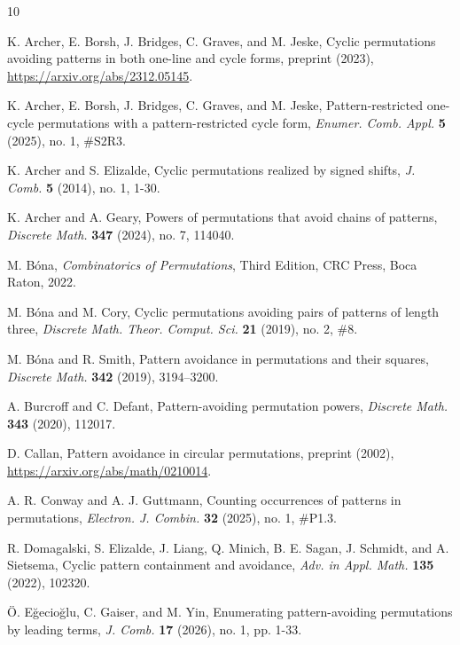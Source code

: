 \documentclass[11pt]{article}
\theoremstyle{definition}
\numberwithin{equation}{section}
\begin{document}
\begin{thebibliography}{10}

 K. Archer, E. Borsh, J. Bridges, C. Graves, and M. Jeske, Cyclic permutations avoiding patterns in both one-line and cycle forms, preprint (2023), \url{https://arxiv.org/abs/2312.05145}.

 K. Archer, E. Borsh, J. Bridges, C. Graves, and M. Jeske, Pattern-restricted one-cycle permutations with a pattern-restricted cycle form, \textit{Enumer. Comb. Appl.} \textbf{5} (2025), no. 1, \#S2R3.

 K. Archer and S. Elizalde, Cyclic permutations realized by signed shifts, \textit{J. Comb.} \textbf{5} (2014), no. 1, 1-30.

 K. Archer and A. Geary, Powers of permutations that avoid chains of patterns, \textit{Discrete Math.} \textbf{347} (2024), no. 7, 114040.

 M. B\'{o}na, \textit{Combinatorics of Permutations}, Third Edition, CRC Press, Boca Raton, 2022.

 M. B\'{o}na and M. Cory, Cyclic permutations avoiding pairs of patterns of length three, \textit{Discrete Math. Theor. Comput. Sci.} \textbf{21} (2019), no. 2, \#8.

 M. B\'{o}na and R. Smith, Pattern avoidance in permutations and their squares, \textit{Discrete Math.} \textbf{342} (2019), 3194–3200.

 A. Burcroff and C. Defant, Pattern-avoiding permutation powers, \textit{Discrete Math.} \textbf{343} (2020), 112017.

 D. Callan, Pattern avoidance in circular permutations, preprint (2002), \url{https://arxiv.org/abs/math/0210014}.

 A. R. Conway and A. J. Guttmann, Counting occurrences of patterns in permutations, \textit{Electron. J. Combin.} \textbf{32} (2025), no. 1, \#P1.3.

 R. Domagalski, S. Elizalde, J. Liang, Q. Minich, B. E. Sagan, J. Schmidt, and A. Sietsema, Cyclic pattern containment and avoidance, \textit{Adv. in Appl. Math.} \textbf{135} (2022), 102320.

 \"{O}. E\u{g}ecio\u{g}lu, C. Gaiser, and M. Yin, Enumerating pattern-avoiding permutations by leading terms, \textit{J. Comb.} \textbf{17} (2026), no. 1, pp. 1-33.


\end{thebibliography}
\end{document}

